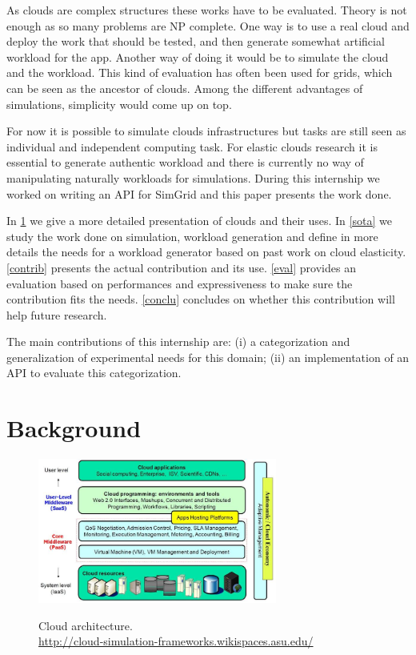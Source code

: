 \documentclass[a4paper, onecolumn, 11pt]{article}
\begin{document}
  As clouds are complex structures these works have to be evaluated. Theory is
  not enough as so many problems are NP complete. One way is to use a real cloud
  and deploy the work that should be tested, and then generate somewhat
  artificial workload for the app. Another way of doing it would be to simulate
  the cloud and the workload. This kind of evaluation has often been used for
  grids, which can be seen as the ancestor of clouds. Among the different
  advantages of simulations, simplicity would come up on top.
  
  For now it is possible to simulate clouds infrastructures but tasks are still
  seen as individual and independent computing task. For elastic clouds research
  it is essential to generate authentic workload and there is currently no way
  of manipulating naturally workloads for simulations. During this internship we
  worked on writing an API for SimGrid and this paper presents the work done.
  
  In \ref{background} we give a more detailed presentation of clouds and their
  uses. In \ref{sota} we study the work done on simulation, workload generation
  and define in more details the needs for a workload generator based on past
  work on cloud elasticity. \ref{contrib} presents the actual contribution and
  its use. \ref{eval} provides an evaluation based on performances and
  expressiveness to make sure the contribution fits the needs. \ref{conclu}
  concludes on whether this contribution will help future research.
  
  The main contributions of this internship are: (i) a categorization and
  generalization of experimental needs for this domain; (ii) an implementation
  of an API to evaluate this categorization.


\section{Background} \label{background}
  \begin{figure}
    \caption{Cloud architecture. \\ 
    \url{http://cloud-simulation-frameworks.wikispaces.asu.edu/}}
    \centering
    \includegraphics[width=0.7\textwidth]{../plots/cloud_architecture}
    \label{cloud_arch}
  \end{figure}
  
\end{document}
